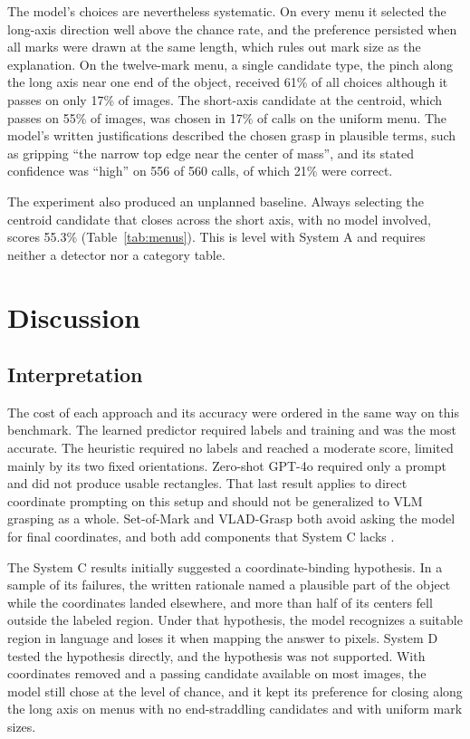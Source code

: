 \documentclass[10pt,conference,compsoc]{IEEEtran}
\begin{document}
The model's choices are nevertheless systematic. On every menu it selected
the long-axis direction well above the chance rate, and the preference
persisted when all marks were drawn at the same length, which rules out mark
size as the explanation. On the twelve-mark menu, a single candidate type,
the pinch along the long axis near one end of the object, received 61\% of
all choices although it passes on only 17\% of images. The short-axis
candidate at the centroid, which passes on 55\% of images, was chosen in 17\%
of calls on the uniform menu. The model's written justifications described
the chosen grasp in plausible terms, such as gripping ``the narrow top edge
near the center of mass'', and its stated confidence was ``high'' on 556 of
560 calls, of which 21\% were correct.

The experiment also produced an unplanned baseline. Always selecting the
centroid candidate that closes across the short axis, with no model involved,
scores 55.3\% (Table~\ref{tab:menus}). This is level with System A and
requires neither a detector nor a category table.

\section{Discussion}

\subsection{Interpretation}

The cost of each approach and its accuracy were ordered in the same way on
this benchmark. The learned predictor required labels and training and was
the most accurate. The heuristic required no labels and reached a moderate
score, limited mainly by its two fixed orientations. Zero-shot GPT-4o
required only a prompt and did not produce usable rectangles. That last
result applies to direct coordinate prompting on this setup and should not be
generalized to VLM grasping as a whole. Set-of-Mark and VLAD-Grasp both avoid
asking the model for final coordinates, and both add components that System C
lacks \cite{yang2024,kulshrestha2025}.

The System C results initially suggested a coordinate-binding hypothesis. In
a sample of its failures, the written rationale named a plausible part of the
object while the coordinates landed elsewhere, and more than half of its
centers fell outside the labeled region. Under that hypothesis, the model
recognizes a suitable region in language and loses it when mapping the answer
to pixels. System D tested the hypothesis directly, and the hypothesis was
not supported. With coordinates removed and a passing candidate available on
most images, the model still chose at the level of chance, and it kept its
preference for closing along the long axis on menus with no end-straddling
candidates and with uniform mark sizes.
\end{document}
